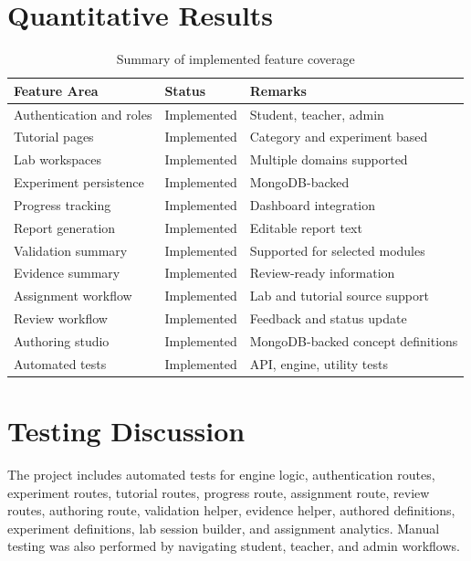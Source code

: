 \documentclass[12pt,a4paper]{report}
\begin{document}
\section{Quantitative Results}
\begin{table}[H]
\centering
\caption{Summary of implemented feature coverage}
\begin{tabular}{p{} p{} p{}}
\toprule
\textbf{Feature Area} & \textbf{Status} & \textbf{Remarks} \\
\midrule
Authentication and roles & Implemented & Student, teacher, admin \\
Tutorial pages & Implemented & Category and experiment based \\
Lab workspaces & Implemented & Multiple domains supported \\
Experiment persistence & Implemented & MongoDB-backed \\
Progress tracking & Implemented & Dashboard integration \\
Report generation & Implemented & Editable report text \\
Validation summary & Implemented & Supported for selected modules \\
Evidence summary & Implemented & Review-ready information \\
Assignment workflow & Implemented & Lab and tutorial source support \\
Review workflow & Implemented & Feedback and status update \\
Authoring studio & Implemented & MongoDB-backed concept definitions \\
Automated tests & Implemented & API, engine, utility tests \\
\bottomrule
\end{tabular}
\end{table}

\section{Testing Discussion}
The project includes automated tests for engine logic, authentication routes, experiment routes, tutorial routes, progress route, assignment route, review routes, authoring route, validation helper, evidence helper, authored definitions, experiment definitions, lab session builder, and assignment analytics. Manual testing was also performed by navigating student, teacher, and admin workflows.
\end{document}

